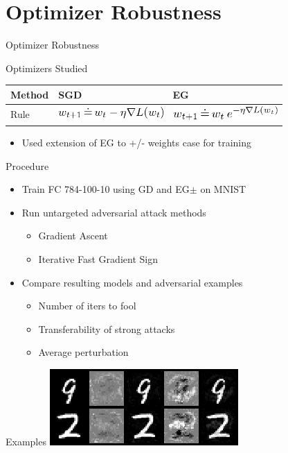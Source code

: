 \documentclass{beamer}
\begin{document}
	\section*{Optimizer Robustness}
	
	\begin{frame}{Optimizer Robustness}
		\begin{block}{Optimizers Studied}
			\begin{center}
				\begin{tabular}{ l | l | l }
					Method & SGD & EG \\ \hline
					Rule & \includegraphics[width=4cm]{sgd_rule} & \includegraphics[width=4cm]{eg_rule}
				\end{tabular}
			\end{center}
		\end{block}
		\begin{itemize}
			\item Used extension of EG to +/- weights case for training
		\end{itemize}
	\end{frame}
	
	\begin{frame}{Procedure}
		\begin{itemize}
			\item Train FC 784-100-10 using GD and EG$\pm$ on MNIST
			\item Run untargeted adversarial attack methods
			\begin{itemize}
				\item Gradient Ascent
				\item Iterative Fast Gradient Sign
			\end{itemize}
			\item Compare resulting models and adversarial examples
			\begin{itemize}
				\item Number of iters to fool
				\item Transferability of strong attacks
				\item Average perturbation
			\end{itemize}
		\end{itemize}
	\end{frame}
	
	\begin{frame}{Examples}
		\centering
		\includegraphics[width=\textwidth]{mnist_attacks}
	\end{frame}
	
\end{document}
